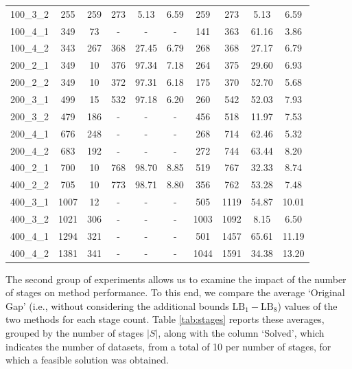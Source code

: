 \documentclass[a4paper,final]{article}
\begin{document}
\begin{table}[H]
{\begin{tabular}{|cc|cccc|cccc|}
            100\_3\_2 & 255  & 259 & 273 & 5.13  & 6.59  & 259  & 273  & 5.13  & 6.59  \\
            100\_4\_1 & 349  & 73  & -   & -     & -     & 141  & 363  & 61.16 & 3.86  \\
            100\_4\_2 & 343  & 267 & 368 & 27.45 & 6.79  & 268  & 368  & 27.17 & 6.79  \\
            200\_2\_1 & 349  & 10  & 376 & 97.34 & 7.18  & 264  & 375  & 29.60 & 6.93  \\
            200\_2\_2 & 349  & 10  & 372 & 97.31 & 6.18  & 175  & 370  & 52.70 & 5.68  \\
            200\_3\_1 & 499  & 15  & 532 & 97.18 & 6.20  & 260  & 542  & 52.03 & 7.93  \\
            200\_3\_2 & 479  & 186 & -   & -     & -     & 456  & 518  & 11.97 & 7.53  \\
            200\_4\_1 & 676  & 248 & -   & -     & -     & 268  & 714  & 62.46 & 5.32  \\
            200\_4\_2 & 683  & 192 & -   & -     & -     & 272  & 744  & 63.44 & 8.20  \\
            400\_2\_1 & 700  & 10  & 768 & 98.70 & 8.85  & 519  & 767  & 32.33 & 8.74  \\
            400\_2\_2 & 705  & 10  & 773 & 98.71 & 8.80  & 356  & 762  & 53.28 & 7.48  \\
            400\_3\_1 & 1007 & 12  & -   & -     & -     & 505  & 1119 & 54.87 & 10.01 \\
            400\_3\_2 & 1021 & 306 & -   & -     & -     & 1003 & 1092 & 8.15  & 6.50  \\
            400\_4\_1 & 1294 & 321 & -   & -     & -     & 501  & 1457 & 65.61 & 11.19 \\
            400\_4\_2 & 1381 & 341 & -   & -     & -     & 1044 & 1591 & 34.38 & 13.20 \\ \hline
            \end{tabular}
            }
        \end{table}

        The second group of experiments allows us to examine the impact of the number of stages on method performance. To this end, we compare the average `Original Gap' (i.e., without considering the additional bounds $\text{LB}_{1} - \text{LB}_{8}$) values of the two methods for each stage count. Table \ref{tab:stages} reports these averages, grouped by the number of stages $|S|$, along with the column `Solved', which indicates the number of datasets, from a total of 10 per number of stages, for which a feasible solution was obtained.
\end{document}
